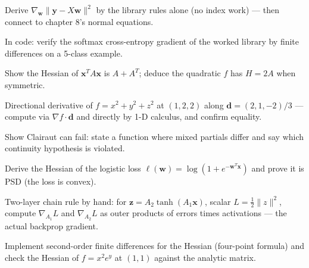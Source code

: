 \begin{exercise}[medium]
Derive $\nabla_{\mathbf w}\lVert\mathbf y-X\mathbf w\rVert^{2}$ by the
library rules alone (no index work) --- then connect to chapter 8's normal
equations.
\end{exercise}

\begin{exercise}[medium]
In code: verify the softmax cross-entropy gradient of the worked library
by finite differences on a 5-class example.
\end{exercise}

\begin{exercise}[medium]
Show the Hessian of $\mathbf x^{T}A\mathbf x$ is $A+A^{T}$; deduce the
quadratic $f$ has $H=2A$ when symmetric.
\end{exercise}

\begin{exercise}[medium]
Directional derivative of $f=x^{2}+y^{2}+z^{2}$ at $(1,2,2)$ along
$\mathbf d=(2,1,-2)/3$ --- compute via $\nabla f\cdot\mathbf d$ and
directly by 1-D calculus, and confirm equality.
\end{exercise}

\begin{exercise}[medium]
Show Clairaut can fail: state a function where mixed partials differ and
say which continuity hypothesis is violated.
\end{exercise}

\begin{exercise}[hard]
Derive the Hessian of the logistic loss
$\ell(\mathbf w)=\log(1+e^{-\mathbf w^{T}\mathbf x})$ and prove it is
PSD (the loss is convex).
\end{exercise}

\begin{exercise}[hard]
Two-layer chain rule by hand: for $\mathbf z=A_2\tanh(A_1\mathbf x)$,
scalar $L=\tfrac12\|z\|^2$, compute $\nabla_{A_1}L$ and $\nabla_{A_2}L$
as outer products of errors times activations --- the actual backprop
gradient.
\end{exercise}

\begin{exercise}[hard]
Implement second-order finite differences for the Hessian (four-point
formula) and check the Hessian of $f=x^{2}e^{y}$ at $(1,1)$ against the
analytic matrix.
\end{exercise}

